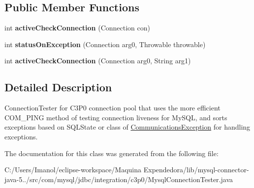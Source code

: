 \subsection*{Public Member Functions}
\begin{DoxyCompactItemize}
\item 
\mbox{\label{classcom_1_1mysql_1_1jdbc_1_1integration_1_1c3p0_1_1_mysql_connection_tester_ad4313c50e2f0e9b4f4912e772db3f459}} 
int {\bfseries active\+Check\+Connection} (Connection con)
\item 
\mbox{\label{classcom_1_1mysql_1_1jdbc_1_1integration_1_1c3p0_1_1_mysql_connection_tester_a9e5aaf5c3dff9a701f6bfe7886591abc}} 
int {\bfseries status\+On\+Exception} (Connection arg0, Throwable throwable)
\item 
\mbox{\label{classcom_1_1mysql_1_1jdbc_1_1integration_1_1c3p0_1_1_mysql_connection_tester_a8897bfadd3a8000a894431230dc428d5}} 
int {\bfseries active\+Check\+Connection} (Connection arg0, String arg1)
\end{DoxyCompactItemize}


\subsection{Detailed Description}
Connection\+Tester for C3\+P0 connection pool that uses the more efficient C\+O\+M\+\_\+\+P\+I\+NG method of testing connection \textquotesingle{}liveness\textquotesingle{} for My\+S\+QL, and \textquotesingle{}sorts\textquotesingle{} exceptions based on S\+Q\+L\+State or class of \textquotesingle{}\mbox{\hyperlink{classcom_1_1mysql_1_1jdbc_1_1_communications_exception}{Communications\+Exception}}\textquotesingle{} for handling exceptions. 

The documentation for this class was generated from the following file\+:\begin{DoxyCompactItemize}
\item 
C\+:/\+Users/\+Imanol/eclipse-\/workspace/\+Maquina Expendedora/lib/mysql-\/connector-\/java-\/5../src/com/mysql/jdbc/integration/c3p0/Mysql\+Connection\+Tester.\+java\end{DoxyCompactItemize}
